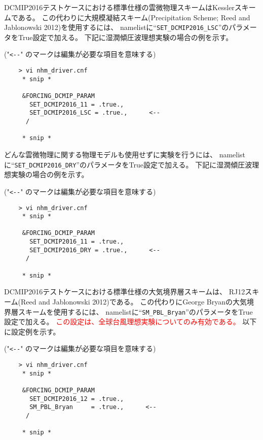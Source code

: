  \noindent DCMIP2016テストケースにおける標準仕様の雲微物理スキームはKesslerスキームである。
この代わりに大規模凝結スキーム(Precipitation Scheme; Reed and Jablonowski 2012)を使用するには、
namelistに``\verb|SET_DCMIP2016_LSC|''のパラメータをTrue設定で加える。
下記に湿潤傾圧波理想実験の場合の例を示す。

 ("\verb|<--|" のマークは編集が必要な項目を意味する)
 \begin{verbatim}
    > vi nhm_driver.cnf
     * snip *

     &FORCING_DCMIP_PARAM
       SET_DCMIP2016_11 = .true.,
       SET_DCMIP2016_LSC = .true.,      <--
      /

     * snip *
 \end{verbatim}



 \noindent どんな雲微物理に関する物理モデルも使用せずに実験を行うには、
namelistに``\verb|SET_DCMIP2016_DRY|''のパラメータをTrue設定で加える。
下記に湿潤傾圧波理想実験の場合の例を示す。

 ("\verb|<--|" のマークは編集が必要な項目を意味する)
 \begin{verbatim}
    > vi nhm_driver.cnf
     * snip *

     &FORCING_DCMIP_PARAM
       SET_DCMIP2016_11 = .true.,
       SET_DCMIP2016_DRY = .true.,      <--
      /

     * snip *
 \end{verbatim}


 \noindent DCMIP2016テストケースにおける標準仕様の大気境界層スキームは、
RJ12スキーム(Reed and Jablonowski 2012)である。
この代わりにGeorge Bryanの大気境界層スキームを使用するには、
namelistに``\verb|SM_PBL_Bryan|''のパラメータをTrue設定で加える。
\textcolor{red}{この設定は、全球台風理想実験についてのみ有効である。}
以下に設定例を示す。


 ("\verb|<--|" のマークは編集が必要な項目を意味する)
 \begin{verbatim}
    > vi nhm_driver.cnf
     * snip *

     &FORCING_DCMIP_PARAM
       SET_DCMIP2016_12 = .true.,
       SM_PBL_Bryan     = .true.,      <--
      /

     * snip *
 \end{verbatim}



